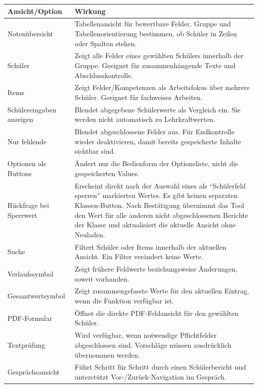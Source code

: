 \documentclass[12pt,a4paper]{article}
\begin{document}
\small
\begin{longtable}{|p{}|p{}|}
\hline
\textbf{Ansicht/Option} & \textbf{Wirkung}\\
\hline
Notenübersicht & Tabellenansicht für bewertbare Felder. Gruppe und Tabellenorientierung bestimmen, ob Schüler in Zeilen oder Spalten stehen.\\
\hline
Schüler & Zeigt alle Felder eines gewählten Schülers innerhalb der Gruppe. Geeignet für zusammenhängende Texte und Abschlusskontrolle.\\
\hline
Items & Zeigt Felder/Kompetenzen als Arbeitsfokus über mehrere Schüler. Geeignet für fachweises Arbeiten.\\
\hline
Schülereingaben anzeigen & Blendet abgegebene Schülerwerte als Vergleich ein. Sie werden nicht automatisch zu Lehrkraftwerten.\\
\hline
Nur fehlende & Blendet abgeschlossene Felder aus. Für Endkontrolle wieder deaktivieren, damit bereits gespeicherte Inhalte sichtbar sind.\\
\hline
Optionen als Buttons & Ändert nur die Bedienform der Optionsliste, nicht die gespeicherten Values.\\
\hline
Rückfrage bei Sperrwert & Erscheint direkt nach der Auswahl eines als \enquote{Schülerfeld sperren} markierten Wertes. Es gibt keinen separaten Klassen-Button. Nach Bestätigung übernimmt das Tool den Wert für alle anderen nicht abgeschlossenen Berichte der Klasse und aktualisiert die aktuelle Ansicht ohne Neuladen.\\
\hline
Suche & Filtert Schüler oder Items innerhalb der aktuellen Ansicht. Ein Filter verändert keine Werte.\\
\hline
Verlaufssymbol & Zeigt frühere Feldwerte beziehungsweise Änderungen, soweit vorhanden.\\
\hline
Gesamtwertsymbol & Zeigt zusammengefasste Werte für den aktuellen Eintrag, wenn die Funktion verfügbar ist.\\
\hline
PDF-Formular & Öffnet die direkte PDF-Feldansicht für den gewählten Schüler.\\
\hline
Textprüfung & Wird verfügbar, wenn notwendige Pflichtfelder abgeschlossen sind. Vorschläge müssen ausdrücklich übernommen werden.\\
\hline
Gesprächsansicht & Führt Schritt für Schritt durch einen Schülerbericht und unterstützt Vor-/Zurück-Navigation im Gespräch.\\
\hline
\end{longtable}
\normalsize
\end{document}
